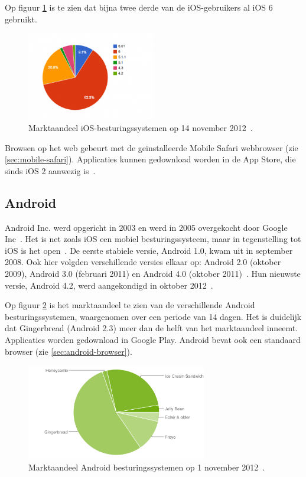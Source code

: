 Op figuur \ref{fig:marketshare-ios} is te zien dat bijna twee derde van de iOS-gebruikers al iOS 6 gebruikt.

\begin{figure}
  \centering
  \includegraphics[width=0.5\textwidth]{figuren/marketshare-ios-2012-11-14.png}
  \caption{Marktaandeel iOS-besturingssystemen op 14 november 2012~\cite{Sylvain2012}.}
  \label{fig:marketshare-ios}
\end{figure}

Browsen op het web gebeurt met de geïnstalleerde Mobile Safari webbrowser (zie \ref{sec:mobile-safari}). Applicaties kunnen gedownload worden in de App Store, die sinds iOS 2 aanwezig is~\cite{Deitel2012}. 

\subsection{Android}
Android Inc. werd opgericht in 2003 en werd in 2005 overgekocht door Google Inc~\cite{Satyesh2012}. Het is net zoals iOS een mobiel besturingssysteem, maar in tegenstelling tot iOS is het open~\cite{David2011}. De eerste stabiele versie, Android 1.0, kwam uit in september 2008. Ook hier volgden verschillende versies elkaar op: Android 2.0 (oktober 2009), Android 3.0 (februari 2011) en Android 4.0 (oktober 2011)~\cite{Satyesh2012}. Hun nieuwste versie, Android 4.2, werd aangekondigd in oktober 2012~\cite{Sawers2012}. 

Op figuur \ref{fig:marketshare-android} is het marktaandeel te zien van de verschillende Android besturingssystemen, waargenomen over een periode van 14 dagen. Het is duidelijk dat Gingerbread (Android 2.3) meer dan de helft van het marktaandeel inneemt.
Applicaties worden gedownload in Google Play. Android bevat ook een standaard browser (zie \ref{sec:android-browser}).

\begin{figure}
  \centering
  \includegraphics[width=0.7\textwidth]{figuren/marketshare-android-2012-11-01.png}
  \caption{Marktaandeel Android besturingssystemen op 1 november 2012~\cite{Android2012}.}
  \label{fig:marketshare-android}
\end{figure}

